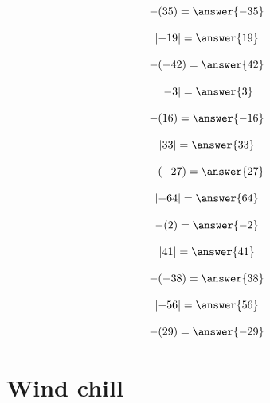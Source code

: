 \documentclass{ximera}
\begin{document}
\begin{problem}
\[
-(35) = \answer{-35}
\]
\end{problem}

\begin{problem}
\[
\left| -19 \right| = \answer{19}
\]
\end{problem}

\begin{problem}
\[
-(-42) = \answer{42}
\]
\end{problem}

\begin{problem}
\[
\left| -3 \right| = \answer{3}
\]
\end{problem}

\begin{problem}
\[
-(16) = \answer{-16}
\]
\end{problem}

\begin{problem}
\[
\left| 33 \right| = \answer{33}
\]
\end{problem}

\begin{problem}
\[
-(-27) = \answer{27}
\]
\end{problem}

\begin{problem}
\[
\left| -64 \right| = \answer{64}
\]
\end{problem}

\begin{problem}
\[
-(2) = \answer{-2}
\]
\end{problem}

\begin{problem}
\[
\left| 41 \right| = \answer{41}
\]
\end{problem}

\begin{problem}
\[
-(-38) = \answer{38}
\]
\end{problem}

\begin{problem}
\[
\left| -56 \right| = \answer{56}
\]
\end{problem}

\begin{problem}
\[
-(29) = \answer{-29}
\]
\end{problem}

\section*{Wind chill}
\end{document}
